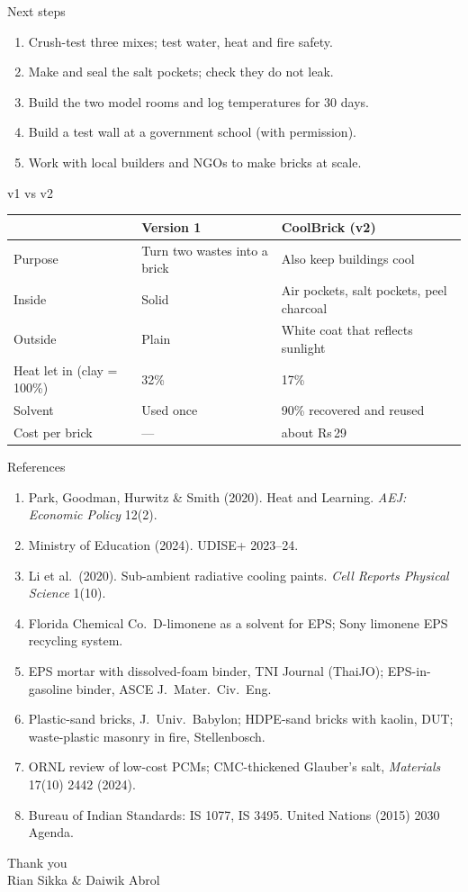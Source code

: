 \documentclass[aspectratio=169,10pt]{beamer}
\newcommand{\rupeesym}{Rs\,}
\begin{document}
\begin{frame}{Next steps}
\begin{enumerate}
  \item Crush-test three mixes; test water, heat and fire safety.
  \item Make and seal the salt pockets; check they do not leak.
  \item Build the two model rooms and log temperatures for 30 days.
  \item Build a test wall at a government school (with permission).
  \item Work with local builders and NGOs to make bricks at scale.
\end{enumerate}
\end{frame}

\begin{frame}{v1 vs v2}
\small
\begin{tabularx}{\textwidth}{@{}lXX@{}}
\toprule
 & Version 1 & CoolBrick (v2) \\
\midrule
Purpose & Turn two wastes into a brick & Also keep buildings cool \\
Inside & Solid & Air pockets, salt pockets, peel charcoal \\
Outside & Plain & White coat that reflects sunlight \\
Heat let in (clay = 100\%) & 32\% & 17\% \\
Solvent & Used once & 90\% recovered and reused \\
Cost per brick & --- & about \rupeesym29 \\
\bottomrule
\end{tabularx}
\end{frame}

\begin{frame}{References}
\tiny
\begin{enumerate}
\item Park, Goodman, Hurwitz \& Smith (2020). Heat and Learning. \emph{AEJ: Economic Policy} 12(2).
\item Ministry of Education (2024). UDISE+ 2023--24.
\item Li et al.\ (2020). Sub-ambient radiative cooling paints. \emph{Cell Reports Physical Science} 1(10).
\item Florida Chemical Co.\ D-limonene as a solvent for EPS; Sony limonene EPS recycling system.
\item EPS mortar with dissolved-foam binder, TNI Journal (ThaiJO); EPS-in-gasoline binder, ASCE J.\ Mater.\ Civ.\ Eng.
\item Plastic-sand bricks, J.\ Univ.\ Babylon; HDPE-sand bricks with kaolin, DUT; waste-plastic masonry in fire, Stellenbosch.
\item ORNL review of low-cost PCMs; CMC-thickened Glauber's salt, \emph{Materials} 17(10) 2442 (2024).
\item Bureau of Indian Standards: IS 1077, IS 3495. United Nations (2015) 2030 Agenda.
\end{enumerate}
\end{frame}

\begin{frame}[standout]
Thank you\\[6pt]
{\normalsize Rian Sikka \& Daiwik Abrol}
\end{frame}
\end{document}
